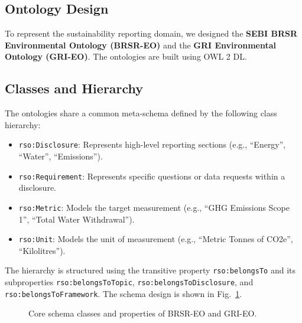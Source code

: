 \documentclass[journal,compsoc]{IEEEtran}
\begin{document}
\begin{itemize}
\section{Ontology Design}
To represent the sustainability reporting domain, we designed the \textbf{SEBI BRSR Environmental Ontology (BRSR-EO)} and the \textbf{GRI Environmental Ontology (GRI-EO)}. The ontologies are built using OWL 2 DL.

\subsection{Classes and Hierarchy}
The ontologies share a common meta-schema defined by the following class hierarchy:
\begin{itemize}
    \item \texttt{rso:Disclosure}: Represents high-level reporting sections (e.g., ``Energy'', ``Water'', ``Emissions'').
    \item \texttt{rso:Requirement}: Represents specific questions or data requests within a disclosure.
    \item \texttt{rso:Metric}: Models the target measurement (e.g., ``GHG Emissions Scope 1'', ``Total Water Withdrawal'').
    \item \texttt{rso:Unit}: Models the unit of measurement (e.g., ``Metric Tonnes of CO2e'', ``Kilolitres'').
\end{itemize}

The hierarchy is structured using the transitive property \texttt{rso:belongsTo} and its subproperties \texttt{rso:belongsToTopic}, \texttt{rso:belongsToDisclosure}, and \texttt{rso:belongsToFramework}. The schema design is shown in Fig.~\ref{fig:ontology}.

\begin{figure}[h]
\centering
{}
\caption{Core schema classes and properties of BRSR-EO and GRI-EO.}
\label{fig:ontology}
\end{figure}


\end{itemize}
\end{document}
